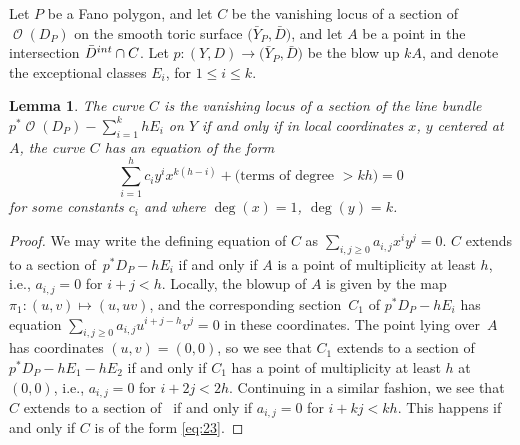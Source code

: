 \documentclass[11pt]{article}
\numberwithin{equation}{section}
\newtheorem{Lemma}[Theorem]{Lemma}
\DeclareMathOperator{\cO}{\mathcal{O}}
\begin{document}
 Let $P$ be a Fano polygon, and let $C$ be the vanishing locus of a section of $\cO(D_P)$ on the smooth toric surface $\bigl(\bar{Y}_P, \bar{D}\bigr)$, and let $A$ be a point in the intersection $\bar{D}^{\rm int} \cap C$. Let $p \colon (Y, D) \rightarrow \bigl(\bar{Y}_P, \bar{D}\bigr)$ be the blow up $kA$, and denote the exceptional classes $E_i$, for $1 \leq i \leq k$.
\begin{Lemma}\label{lem:mutabilitygeometric}
	The curve $C$ is the vanishing locus of a section of the line bundle
$
	p^*\cO(D_P)-\sum_{i=1}^k h E_i
$
	 on $Y$ if and only if in local coordinates $x$, $y$ centered at $A$, the curve $C$ has an equation of the form
	\begin{equation}\label{eq:23}
		\sum_{i=1}^hc_i y^ix^{k(h-i)}+\text{$($terms of degree $>kh)$}=0
	\end{equation}
for some constants $c_i$ and where $\deg(x)=1$, $\deg(y)=k$.
\end{Lemma}
\begin{proof}
	We may write the defining equation of $C$ as $\sum_{i,j \geq 0} a_{i,j} x^i y^j=0$. $C$ extends to a section of~${p^*D_P-hE_i}$ if and only if $A$ is a point of multiplicity at least $h$, i.e., $a_{i,j}=0$ for $i+j<h$.
	Locally, the blowup of $A$ is given by the map $\pi_1 \colon (u,v) \mapsto (u, uv)$, and the corresponding section~$C_1$ of $p^*D_P-hE_i$ has equation
$\sum_{i,j \geq 0} a_{i,j} u^{i+j-h}v^j=0$
	 in these coordinates. The point lying over~$A$ has coordinates $(u,v)=(0,0)$, so we see that $C_1$ extends to a section of $p^*D_P-hE_1-hE_2$ if and only if $C_1$ has a point of multiplicity at least $h$ at $(0,0)$, i.e., $a_{i, j}=0$ for $i+2j<2h$.
	Continuing in a similar fashion, we see that $C$ extends to a section of~ if and only if $a_{i,j}=0$ for $i+kj<kh$.
	This happens if and only if $C$ is of the form \eqref{eq:23}.
\end{proof}
\end{document}
